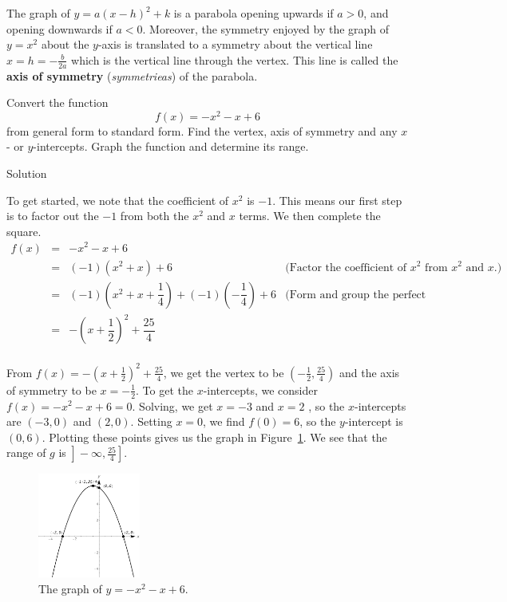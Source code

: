 The graph of $y = a(x-h)^2 + k$ is a parabola opening upwards if $a > 0$, and opening downwards if $a < 0$. Moreover, the symmetry enjoyed by the graph of $y = x^2$ about the $y$-axis is translated to a symmetry about the vertical line $x=h=-\frac{b}{2a}$ which is the vertical line through the vertex. This line is called the \textbf{axis of symmetry} (\textit{symmetrieas}) of the parabola. 


\ifvc
\begin{example}
Convert the function
$$f(x) = -x^2-x+6$$
 from general form to standard form.  Find the vertex, axis of symmetry and any $x$- or $y$-intercepts.  Graph the function and determine its range.

Solution 

To get started, we note that the coefficient of $x^2$ is $-1$.  This means our first step is to factor out the $-1$ from both the $x^2$ and $x$ terms.  We then complete the square. \[ \begin{array}{rclr}


f(x) & = & -x^2-x+6 &  \\
	   & = & (-1)\left(x^2 + x \right) + 6 & \text{(Factor the coefficient of $x^2$ from $x^2$ and $x$.)} \\ [5pt]
		 & = & (-1)\left(x^2 + x + \dfrac{1}{4}\right) + (-1)\left(-\dfrac{1}{4}\right) + 6 & \text{(Form and group the perfect square.)}\\ [5pt]
		  & = & -\left(x +\dfrac{1}{2}\right)^2 + \dfrac{25}{4} & \\
		 \end{array} \]

From $f(x) =  -\left(x +\frac{1}{2}\right)^2 + \frac{25}{4}$, we get the vertex to be $\left(-\frac{1}{2}, \frac{25}{4}\right)$ and the axis of symmetry to be $x = -\frac{1}{2}$.  To get the $x$-intercepts, we consider $f(x) = -x^2-x+6 = 0$.  Solving, we get $x = -3$ and $x=2$ , so the $x$-intercepts are $(-3,0)$ and $(2,0)$.  Setting $x=0$, we find $f(0) = 6$, so the $y$-intercept is $(0,6)$. Plotting these points gives us the graph in Figure~\ref{fig_algebraic_2}.  We see that the range of $g$ is $\left.\right]-\infty, \frac{25}{4}\left.\right]$.

\begin{figure}[H]
	\begin{center}
			\includegraphics[width=0.3\textwidth]{fig_algebraic_2}
	\caption{The graph of $y=-x^2-x+6$.}
	\label{fig_algebraic_2}
	\end{center}
\end{figure}
\end{example}


